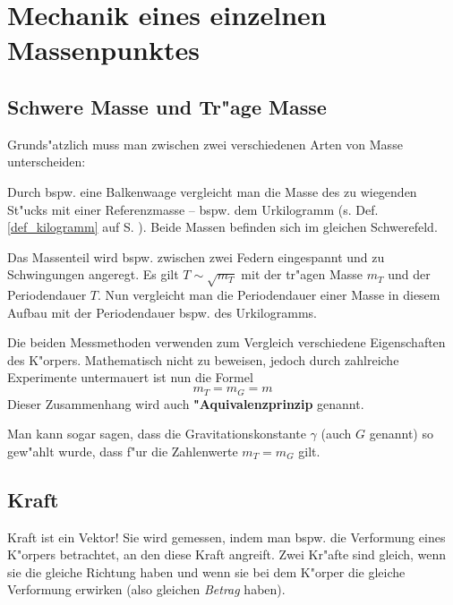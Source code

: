 \chapter{Mechanik eines einzelnen Massenpunktes}



\section{Schwere Masse und Tr"age Masse}

Grunds"atzlich muss man zwischen zwei verschiedenen Arten von Masse
unterscheiden:

\begin{description}[\setlabelstyle{\bfseries\slshape}]
\item[{Schwere Masse} $m_G$] Durch bspw. eine Balkenwaage vergleicht
   man die Masse des zu wiegenden St"ucks mit einer Referenzmasse --
   bspw. dem Urkilogramm (s. Def. \ref{def_kilogramm} auf
   S. \pageref{def_kilogramm}). Beide Massen befinden sich im gleichen
   Schwerefeld.

\item[{Tr"age Masse} $m_T$] Das Massenteil wird bspw. zwischen zwei
   Federn eingespannt und zu Schwingungen angeregt. Es gilt $T \sim
   \sqrt{m_T}$ mit der tr"agen Masse $m_T$ und der Periodendauer
   $T$. Nun vergleicht man die Periodendauer einer Masse in diesem
   Aufbau mit der Periodendauer bspw. des Urkilogramms.
\end{description}
Die beiden Messmethoden verwenden zum Vergleich verschiedene
Eigenschaften des K"orpers. Mathematisch nicht zu beweisen, jedoch
durch zahlreiche Experimente untermauert ist nun die Formel
$$
\boxed{m_T = m_G = m}
$$
Dieser Zusammenhang wird auch \textbf{"Aquivalenzprinzip} genannt.

Man kann sogar sagen, dass die
Gravitationskonstante $\gamma$ (auch $G$
genannt) so gew"ahlt wurde, dass f"ur die Zahlenwerte $m_T = m_G$
gilt.




\section{Kraft}

Kraft ist ein Vektor! Sie wird gemessen, indem man bspw. die
Verformung eines K"orpers betrachtet, an den diese Kraft angreift. Zwei
Kr"afte sind gleich, wenn sie die gleiche Richtung haben und wenn
sie bei dem K"orper die gleiche Verformung erwirken (also gleichen
\emph{Betrag} haben).








